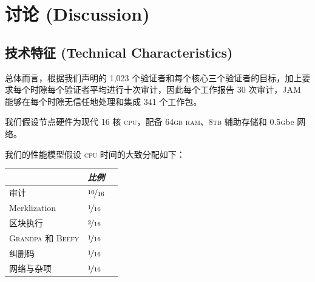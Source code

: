 \section{讨论 (Discussion)}\label{sec:discussion}




\subsection{技术特征 (Technical Characteristics)}

总体而言，根据我们声明的 1,023 个验证者和每个核心三个验证者的目标，加上要求每个时隙每个验证者平均进行十次审计，因此每个工作报告 30 次审计，JAM 能够在每个时隙无信任地处理和集成 341 个工作包。

我们假设节点硬件为现代 16 核 \textsc{cpu}，配备 64\textsc{gb} \textsc{ram}、8\textsc{tb} 辅助存储和 0.5\textsc{g}be 网络。

我们的性能模型假设 \textsc{cpu} 时间的大致分配如下：

\begin{center}
  \begin{tabular}[h]{@{}lll@{}}
    \toprule
    & \emph{比例} \\
    \midrule
    审计 & $\nicefrac{10}{16}$ \\
    Merklization & $\nicefrac{1}{16}$ \\
    区块执行 & $\nicefrac{2}{16}$ \\
    \textsc{Grandpa} 和 \textsc{Beefy} & $\nicefrac{1}{16}$ \\
    纠删码 & $\nicefrac{1}{16}$ \\
    网络与杂项 & $\nicefrac{1}{16}$ \\
    \bottomrule
  \end{tabular}
\end{center}

